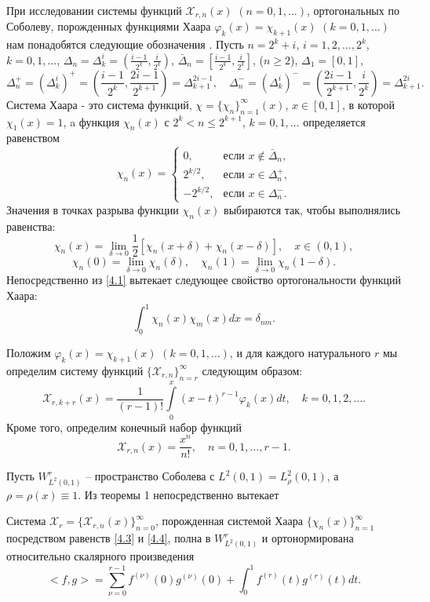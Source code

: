 При исследовании системы функций $\mathcal{ X}_{r,n}(x)$ $(n=0,1,\ldots)$, ортогональных по Соболеву, порожденных функциями  Хаара $\varphi_k(x)=\chi_{k+1}(x)$ $(k=0,1,\ldots)$ нам понадобятся следующие обозначения \cite{KashSaak}. Пусть $n=2^k+i$, $i=1,2,\ldots, 2^k$,  $k=0,1,\ldots$,
$\Delta_n=\Delta_k^i=(\frac{i-1}{2^k},\frac{i}{2^k})$, $\bar\Delta_n=[\frac{i-1}{2^k},\frac{i}{2^k}]$, ($n\ge2$), $\Delta_1=[0,1]$,
$$
 \Delta_n^+=(\Delta_k^i)^+=(\frac{i-1}{2^k},\frac{2i-1}{2^{k+1}})=\Delta_{k+1}^{2i-1}, \quad \Delta_n^-=(\Delta_k^i)^-=(\frac{2i-1}{2^{k+1}},\frac{i}{2^{k}})=\Delta_{k+1}^{2i}.
$$
Система Хаара - это система функций, $\chi=\{\chi_n\}_{n=1}^\infty(x)$, $x\in[0,1]$, в которой $\chi_1(x)=1$, a функция $\chi_n(x)$
с $2^k<n\le 2^{k+1}$, $k=0,1,\ldots$ определяется равенством
\begin{equation}\label{4.1}
\chi_n(x)=\begin{cases} 0,&\text{если $x\notin \bar\Delta_n$,}\\
2^{k/2},& \text{если $x\in \Delta_n^+$,}\\
-2^{k/2},& \text{если $x\in \Delta_n^-$.}
\end{cases}
\end{equation}
Значения в точках разрыва функции $\chi_n(x)$ выбираются так, чтобы выполнялись равенства:
$$
\chi_n(x)=\lim_{\delta\to0}\frac12[\chi_n(x+\delta)+\chi_n(x-\delta)],\quad x\in (0,1),
$$
$$
\chi_n(0)=\lim_{\delta\to0} \chi_n(\delta),\quad \chi_n(1)=\lim_{\delta\to0} \chi_n(1-\delta).
$$
Непосредственно из \eqref{4.1} вытекает следующее свойство ортогональности функций Хаара:
\begin{equation}\label{4.2}
\int_0^1\chi_n(x)\chi_m(x)dx=\delta_{nm}.
\end{equation}


Положим $\varphi_k(x)=\chi_{k+1}(x)$ $(k=0,1,\ldots)$, и для каждого натурального $r$ мы определим систему функций $\{\mathcal{ X}_{r,n}\}_{n=r}^\infty$ следующим образом:
\begin{equation}\label{4.3}
\mathcal{ X}_{r,k+r}(x) =\frac{1}{(r-1)!}\int\limits_0^x(x-t)^{r-1}\varphi_k(x)dt, \quad k=0,1, 2, \ldots.
\end{equation}
 Кроме того, определим конечный набор функций
  \begin{equation}\label{4.4}
\mathcal{ X}_{r,n}(x) =\frac{x^n}{n!}, \quad n=0,1,\ldots, r-1.
\end{equation}

  Пусть $W^r_{L^2(0,1)}$ --  пространство Соболева с  $L^2(0,1)=L^2_\rho(0,1)$, а $\rho=\rho(x) \equiv 1$. Из теоремы 1 непосредственно вытекает
 \begin{corollary}
   Система $\mathcal{ X}_r=\{\mathcal{ X}_{r,n}(x)\}_{n=0}^\infty$, порожденная системой Хаара $\{\chi_{n}(x)\}_{n=1}^\infty$ посредством равенств \eqref{4.3} и \eqref{4.4}, полна  в $W^r_{L^2(0,1)}$ и ортонормирована относительно скалярного произведения
 \begin{equation}\label{4.5}
<f,g>=\sum_{\nu=0}^{r-1}f^{(\nu)}(0)g^{(\nu)}(0)+\int_{0}^{1} f^{(r)}(t)g^{(r)}(t) dt.
\end{equation}
 \end{corollary}

